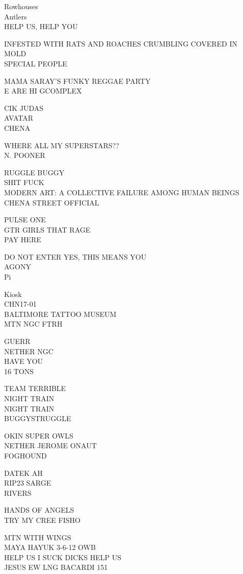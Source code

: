 \documentclass[10pt,letterpaper]{article}
\begin{document}
Rowhouses\\
Antlers\\
HELP US, HELP YOU

INFESTED WITH RATS AND ROACHES CRUMBLING COVERED IN MOLD\\
SPECIAL PEOPLE

MAMA SARAY'S FUNKY REGGAE PARTY\\
E ARE HI GCOMPLEX

CIK JUDAS\\
AVATAR\\
CHENA

WHERE ALL MY SUPERSTARS??\\
N. POONER

RUGGLE BUGGY\\
SHIT FUCK\\
MODERN ART: A COLLECTIVE FAILURE AMONG HUMAN BEINGS\\
CHENA STREET OFFICIAL

PULSE ONE\\
GTR GIRLS THAT RAGE\\
PAY HERE

DO NOT ENTER YES, THIS MEANS YOU\\
AGONY\\
Pi

Kiosk\\
CHN17{-}01\\
BALTIMORE TATTOO MUSEUM\\
MTN NGC FTRH

GUERR\\
NETHER NGC\\
HAVE YOU\\
16 TONS

TEAM TERRIBLE\\
NIGHT TRAIN\\
NIGHT TRAIN\\
BUGGYSTRUGGLE

OKIN SUPER OWLS\\
NETHER JEROME ONAUT\\
FOGHOUND

DATEK AH\\
RIP23 SARGE\\
RIVERS

HANDS OF ANGELS\\
TRY MY CREE FISHO

MTN WITH WINGS\\
MAYA HAYUK 3{-}6{-}12 OWB\\
HELP US I SUCK DICKS HELP US\\
JESUS EW LNG BACARDI 151
\end{document}
